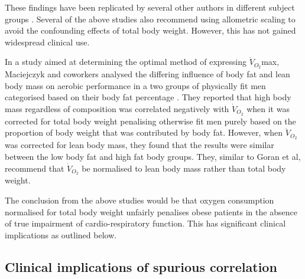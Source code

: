 These findings have been replicated by several other authors in different subject groups \parencite{loftin_scaling_2001,  lemaitre_maximum_2006,savonen_current_2012, krachler_cardiopulmonary_2014}. Several of the above studies also recommend using allometric scaling to avoid the confounding effects of total body weight. However, this has not gained widespread clinical use.

In a study aimed at determining the optimal method of expressing $\dot{V}_{O_2}$max, Maciejczyk and coworkers analysed the differing influence of body fat and lean body mass on aerobic performance in a two groups of physically fit men categorised based on their body fat percentage \parencite{maciejczyk_influence_2014}. They reported that high body mass regardless of composition was correlated negatively with $\dot{V}_{O_2}$ when it was corrected for total body weight penalising otherwise fit men purely based on the proportion of body weight that was contributed by body fat. However, when $\dot{V}_{O_2}$ was corrected for lean body mass, they found that the results were similar between the low body fat and high fat body groups. They, similar to Goran et al\parencite{goran_total_2000}, recommend that $\dot{V}_{O_2}$ be normalised to lean body mass rather than total body weight.

The conclusion from the above studies would be that oxygen consumption normalised for total body weight unfairly penalises obese patients in the absence of true impairment of cardio-respiratory function. This has significant clinical implications as outlined below.

\subsection{Clinical implications of spurious correlation}

